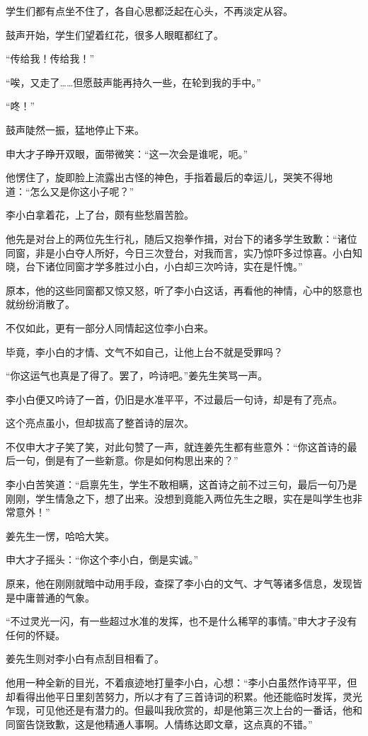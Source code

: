\begin{this_body}
学生们都有点坐不住了，各自心思都泛起在心头，不再淡定从容。

鼓声开始，学生们望着红花，很多人眼眶都红了。

“传给我！传给我！”

“唉，又走了……但愿鼓声能再持久一些，在轮到我的手中。”

“咚！”

鼓声陡然一振，猛地停止下来。

申大才子睁开双眼，面带微笑：“这一次会是谁呢，呃。”

他愣住了，旋即脸上流露出古怪的神色，手指着最后的幸运儿，哭笑不得地道：“怎么又是你这小子呢？”

李小白拿着花，上了台，颇有些愁眉苦脸。

他先是对台上的两位先生行礼，随后又抱拳作揖，对台下的诸多学生致歉：“诸位同窗，非是小白夺人所好，今日三次登台，对我而言，实乃惊吓多过惊喜。小白知晓，台下诸位同窗才学多胜过小白，小白却三次吟诗，实在是忏愧。”

原本，他的这些同窗都又惊又怒，听了李小白这话，再看他的神情，心中的怒意也就纷纷消散了。

不仅如此，更有一部分人同情起这位李小白来。

毕竟，李小白的才情、文气不如自己，让他上台不就是受罪吗？

“你这运气也真是了得了。罢了，吟诗吧。”姜先生笑骂一声。

李小白便又吟诗了一首，仍旧是水准平平，不过最后一句诗，却是有了亮点。

这个亮点虽小，但却拔高了整首诗的层次。

不仅申大才子笑了笑，对此句赞了一声，就连姜先生都有些意外：“你这首诗的最后一句，倒是有了一些新意。你是如何构思出来的？”

李小白苦笑道：“启禀先生，学生不敢相瞒，这首诗之前不过三句，最后一句乃是刚刚，学生情急之下，想了出来。没想到竟能入两位先生之眼，实在是叫学生也非常意外！”

姜先生一愣，哈哈大笑。

申大才子摇头：“你这个李小白，倒是实诚。”

原来，他在刚刚就暗中动用手段，查探了李小白的文气、才气等诸多信息，发现皆是中庸普通的气象。

“不过灵光一闪，有一些超过水准的发挥，也不是什么稀罕的事情。”申大才子没有任何的怀疑。

姜先生则对李小白有点刮目相看了。

他用一种全新的目光，不着痕迹地打量李小白，心想：“李小白虽然作诗平平，但却看得出他平日里刻苦努力，所以才有了三首诗词的积累。他还能临时发挥，灵光乍现，可见他还是有潜力的。但最叫我欣赏的，却是他第三次上台的一番话，他和同窗告饶致歉，这是他精通人事啊。人情练达即文章，这点真的不错。”


\end{this_body}
